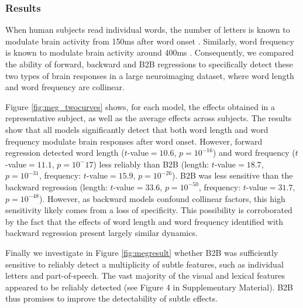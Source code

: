 
\subsubsection{Results}
When human subjects read individual words, the number of letters is known to modulate
brain activity from 150ms after word onset \citep{pegado2014timing}.
Similarly, word frequency is known to modulate brain activity around 400ms
\citep{kutas2011thirty}. Consequently, we compared the ability of forward, backward and B2B regressions to specifically detect these two types of brain responses in a large neuroimaging dataset, where word length and word frequency are collinear.

Figure \ref{fig:meg_twocurves} shows, for each model, the effects obtained
in a representative subject, as well as the average effects across subjects.
The results show that all models significantly detect that both word length and
word frequency modulate brain responses after word onset. However,
forward regression detected word length ($t$-value$=10.6$, $p=10^{-16}$) and
word frequency ($t$-value$=11.1$, $p=10^-17$) less reliably than B2B (length:
$t$-value$=18.7$, $p=10^{-31}$, frequency: $t$-value$=15.9$, $p=10^{-26}$). B2B
was less sensitive than the backward regression (length: $t$-value$=33.6$,
$p=10^{-50}$, frequency: $t$-value$=31.7$, $p=10^{-48}$). However, as backward models confound collinear factors, this high sensitivity likely comes from a loss of specificity. This possibility is corroborated by the fact that the effects of word length and word frequency identified with backward regression present largely similar dynamics.

Finally we investigate in Figure \ref{fig:megresult} whether B2B was sufficiently sensitive to reliably detect a multiplicity of subtle features, such as individual letters and part-of-speech. The vast majority of the visual and lexical features appeared to be reliably detected (see Figure 4 in Supplementary Material). B2B thus promises to improve the detectability of subtle effects.

